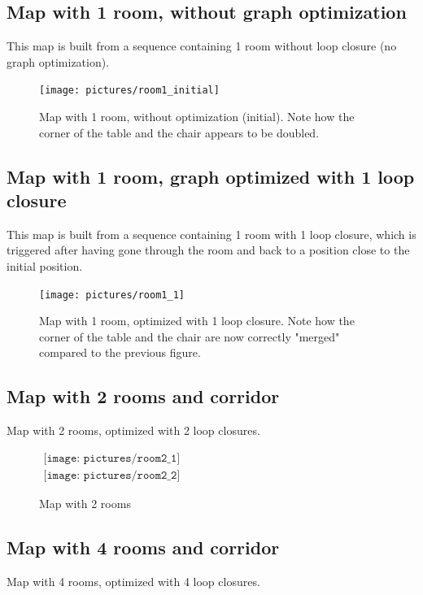 \subsection{Map with 1 room, without graph optimization}

This map is built from a sequence containing 1 room without loop closure (no graph optimization). 

\begin{figure}[h!]
\centering
\texttt{[image: pictures/room1\_initial]}
\caption{Map with 1 room, without optimization (initial). Note how the corner of the table and the chair appears to be doubled.}
\end{figure}

\subsection{Map with 1 room, graph optimized with 1 loop closure}
This map is built from a sequence containing 1 room with 1 loop closure, which is triggered after having gone through the room and back to a position close to the initial position. 

\begin{figure}[h!]
\centering
\texttt{[image: pictures/room1\_1]}
\caption{Map with 1 room, optimized with 1 loop closure. Note how the corner of the table and the chair are now correctly "merged" compared to the previous figure.}
\end{figure}

\clearpage

\subsection{Map with 2 rooms and corridor}
Map with 2 rooms, optimized with 2 loop closures.

\begin{figure}[h!]
\centering$
\begin{array}{c}
\texttt{[image: pictures/room2\_1]}\\
\texttt{[image: pictures/room2\_2]}
\end{array}$
\caption{Map with 2 rooms}
\end{figure}

\clearpage

\subsection{Map with 4 rooms and corridor}
Map with 4 rooms, optimized with 4 loop closures.

